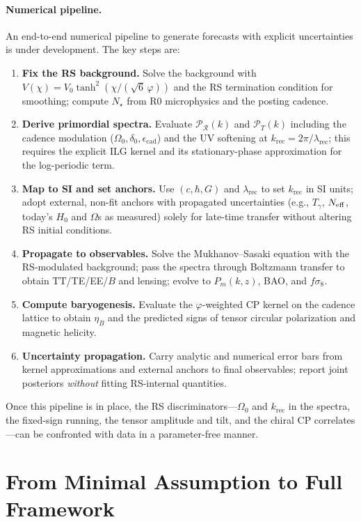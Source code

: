 \documentclass[11pt]{article}
\theoremstyle{definition}
\theoremstyle{remark}
\begin{document}
\paragraph{Numerical pipeline.}
An end-to-end numerical pipeline to generate forecasts with explicit uncertainties is under development. The key steps are:
\begin{enumerate}
  \item \textbf{Fix the RS background.} Solve the background with \(V(\chi)=V_0\tanh^2(\chi/(\sqrt6\,\varphi))\) and the RS termination condition for smoothing; compute \(N_\star\) from R0 microphysics and the posting cadence.
  \item \textbf{Derive primordial spectra.} Evaluate \(\mathcal P_{\mathcal R}(k)\) and \(\mathcal P_T(k)\) including the cadence modulation (\(\Omega_0,\delta_{0},\epsilon_{\mathrm{cad}}\)) and the UV softening at \(k_{\mathrm{rec}}=2\pi/\lambda_{\mathrm{rec}}\); this requires the explicit ILG kernel and its stationary-phase approximation for the log-periodic term.
  \item \textbf{Map to SI and set anchors.} Use \((c,\hbar,G)\) and \(\lambda_{\mathrm{rec}}\) to set \(k_{\mathrm{rec}}\) in SI units; adopt external, non-fit anchors with propagated uncertainties (e.g., \(T_\gamma\), \(N_{\rm eff}\), today’s \(H_0\) and \(\Omega\)s as measured) solely for late-time transfer without altering RS initial conditions.
  \item \textbf{Propagate to observables.} Solve the Mukhanov–Sasaki equation with the RS-modulated background; pass the spectra through Boltzmann transfer to obtain TT/TE/EE/\(B\) and lensing; evolve to \(P_m(k,z)\), BAO, and \(f\sigma_8\).
  \item \textbf{Compute baryogenesis.} Evaluate the \(\varphi\)-weighted CP kernel on the cadence lattice to obtain \(\eta_B\) and the predicted signs of tensor circular polarization and magnetic helicity.
  \item \textbf{Uncertainty propagation.} Carry analytic and numerical error bars from kernel approximations and external anchors to final observables; report joint posteriors \emph{without} fitting RS-internal quantities.
\end{enumerate}
Once this pipeline is in place, the RS discriminators—\(\Omega_0\) and \(k_{\mathrm{rec}}\) in the spectra, the fixed-sign running, the tensor amplitude and tilt, and the chiral CP correlates—can be confronted with data in a parameter-free manner.

\section{From Minimal Assumption to Full Framework}
\end{document}
